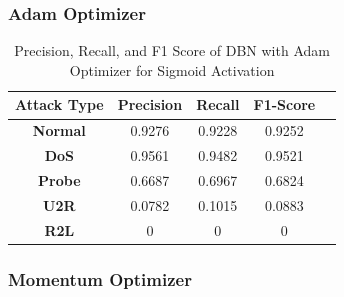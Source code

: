 \documentclass[12pt, a4paper]{report}
\begin{document}
\subsubsection{Adam Optimizer}
\begin{table}[ht]
\centering
\captionsetup{justification=centering,margin=2cm}
\begin{tabular}{|c|c|c|c|c|}
\hline
\multicolumn{1}{|c|}{\textbf{Attack Type}} & \multicolumn{1}{c|}{\textbf{Precision}} & \multicolumn{1}{c|}{\textbf{Recall}} & \multicolumn{1}{c|}{\textbf{F1-Score}} \\ \hline
\textbf{Normal}        & 0.9276                                  & 0.9228                               & 0.9252                                                                  \\ \hline
\textbf{DoS}           & 0.9561                                  & 0.9482                                &  0.9521                                                                   \\ \hline
\textbf{Probe}         & 0.6687                                  & 0.6967                                & 0.6824                                                                  \\ \hline
\textbf{U2R}           & 0.0782                                   & 0.1015                                & 0.0883                                                                     \\ \hline
\textbf{R2L}           & 0                                       & 0                                    & 0                                                                          \\ \hline
\end{tabular}
\caption{Precision, Recall, and F1 Score of DBN with Adam Optimizer for Sigmoid Activation}
\label{prf1_adam_dbn}
\end{table}

\subsubsection{Momentum Optimizer}
\end{document}
